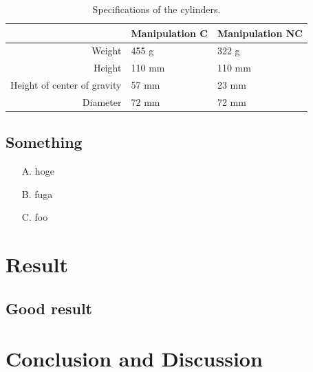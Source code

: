 \documentclass[letterpaper, 10 pt, conference]{IEEEtran}  %
\begin{document}
\begin{table}[t!]
 \centering
 \caption{Specifications of the cylinders.}
      \begin{tabular}{|r||l|l|} \hline
               & Manipulation C & Manipulation NC \\ \hline \hline
              Weight & 455 g & 322 g \\ \hline
              Height & 110 mm & 110 mm \\ \hline
              Height of center of gravity & 57 mm & 23 mm \\ \hline
              Diameter & 72 mm & 72 mm \\ \hline
            \end{tabular}
    \label{tab:specification-of-robot}
\end{table}


\subsection{Something}
\begin{itemize}
    \item[A.] hoge
    \item[B.] fuga
    \item[C.] foo
\end{itemize}




\section{Result}

\subsection{Good result}


\section{Conclusion and Discussion}





\addtolength{\textheight}{-12cm}   %
\end{document}
